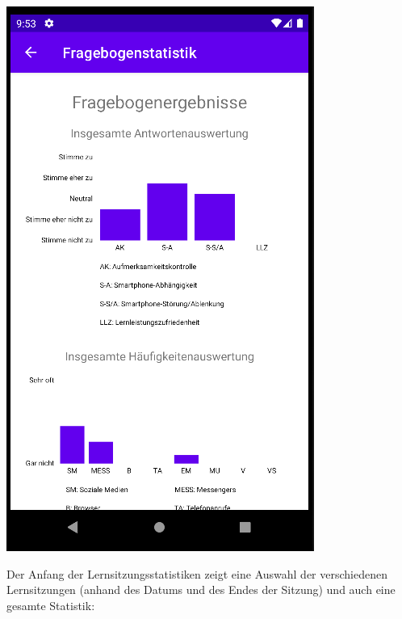 \documentclass{article}
\begin{document}
\begin{center}
    \includegraphics[scale=0.45]{stats_survey.png}
\end{center}
\newpage
\noindent Der Anfang der Lernsitzungsstatistiken zeigt eine Auswahl der verschiedenen Lernsitzungen (anhand des Datums und des Endes der Sitzung) und auch eine gesamte Statistik:
\end{document}
